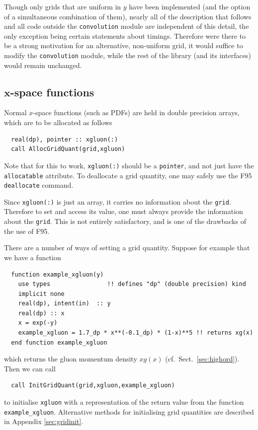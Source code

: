 \documentclass[12pt]{article}
\newcommand{\cf}{cf.\ }
\begin{document}
Though only grids that are uniform in $y$ have been implemented
(and the option of a simultaneous combination of them),
nearly all of the description that follows and all code outside the
\texttt{convolution} module are independent of this detail, the only
exception being certain statements about timings. Therefore were
there to be a strong motivation for an alternative, non-uniform grid,
it would suffice to modify the \texttt{convolution} module, while the
rest of the library (and its interfaces) would remain unchanged.

\subsection[$x$-space functions]{$\boldsymbol{x}$-space functions}
\label{sec:xspc}

Normal $x$-space functions (such as PDFs) are
held in double precision arrays, which are to be allocated as follows
\begin{lstlisting}
  real(dp), pointer :: xgluon(:)
  call AllocGridQuant(grid,xgluon)
\end{lstlisting}
Note that for this to work, \texttt{xgluon(:)} should be a
\texttt{pointer}, and not just 
have the \texttt{allocatable} attribute. To
deallocate a grid quantity, one may safely use the F95
\texttt{deallocate} command.

Since \texttt{xgluon(:)} is just an array, it carries no information
about the \texttt{grid}. Therefore to set and access its value, one
must always provide the information about the \texttt{grid}. This is
not entirely satisfactory, and is one of the drawbacks of the use of
F95.

There are a number of ways of setting a grid quantity. Suppose 
for example  that we have
a function
\begin{lstlisting}
  function example_xgluon(y)
    use types                !! defines "dp" (double precision) kind
    implicit none
    real(dp), intent(in)  :: y
    real(dp) :: x    
    x = exp(-y)
    example_xgluon = 1.7_dp * x**(-0.1_dp) * (1-x)**5 !! returns xg(x)  
  end function example_xgluon
\end{lstlisting}
which
returns the gluon
momentum density $xg(x)$ (\cf Sect.~\ref{sec:highord}).
%
Then we can call
\begin{lstlisting}
  call InitGridQuant(grid,xgluon,example_xgluon)
\end{lstlisting}
to initialise \texttt{xgluon} with a representation of the return value
from the function \texttt{example\_xgluon}.
Alternative methods for initialising grid quantities
are described in Appendix \ref{sec:gridinit}.
\end{document}
